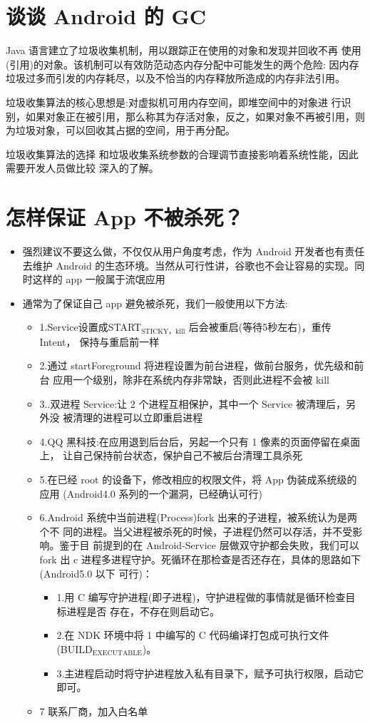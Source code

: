 \documentclass[9pt, b5paper]{article}
\begin{document}
\section{谈谈 Android 的 GC}
\label{sec-13}
Java 语言建立了垃圾收集机制，用以跟踪正在使用的对象和发现并回收不再 使用(引用)的对象。该机制可以有效防范动态内存分配中可能发生的两个危险: 因内存垃圾过多而引发的内存耗尽，以及不恰当的内存释放所造成的内存非法引用。

垃圾收集算法的核心思想是:对虚拟机可用内存空间，即堆空间中的对象进 行识别，如果对象正在被引用，那么称其为存活对象，反之，如果对象不再被引用，则为垃圾对象，可以回收其占据的空间，用于再分配。

垃圾收集算法的选择 和垃圾收集系统参数的合理调节直接影响着系统性能，因此需要开发人员做比较 深入的了解。

\section{怎样保证 App 不被杀死？}
\label{sec-14}
\begin{itemize}
\item 强烈建议不要这么做，不仅仅从用户角度考虑，作为 Android 开发者也有责任去维护 Android 的生态环境。当然从可行性讲，谷歌也不会让容易的实现。同 时这样的 app 一般属于流氓应用
\item 通常为了保证自己 app 避免被杀死，我们一般使用以下方法:
\begin{itemize}
\item 1.Service设置成START$_{\text{STICKY，kill}}$ 后会被重启(等待5秒左右)，重传Intent， 保持与重启前一样
\item 2.通过 startForeground 将进程设置为前台进程，做前台服务，优先级和前台 应用一个级别，除非在系统内存非常缺，否则此进程不会被 kill
\item 3..双进程 Service:让 2 个进程互相保护，其中一个 Service 被清理后，另外没 被清理的进程可以立即重启进程
\item 4.QQ 黑科技:在应用退到后台后，另起一个只有 1 像素的页面停留在桌面上， 让自己保持前台状态，保护自己不被后台清理工具杀死
\item 5.在已经 root 的设备下，修改相应的权限文件，将 App 伪装成系统级的应用 (Android4.0 系列的一个漏洞，已经确认可行)
\item 6.Android 系统中当前进程(Process)fork 出来的子进程，被系统认为是两个不 同的进程。当父进程被杀死的时候，子进程仍然可以存活，并不受影响。鉴于目 前提到的在 Android-Service 层做双守护都会失败，我们可以 fork 出 c 进程多进程守护。死循环在那检查是否还存在，具体的思路如下(Android5.0 以下 可行)：
\begin{itemize}
\item 1.用 C 编写守护进程(即子进程)，守护进程做的事情就是循环检查目标进程是否 存在，不存在则启动它。
\item 2.在 NDK 环境中将 1 中编写的 C 代码编译打包成可执行文件 (BUILD$_{\text{EXECUTABLE}}$)。
\item 3.主进程启动时将守护进程放入私有目录下，赋予可执行权限，启动它即可。
\end{itemize}
\item 7 联系厂商，加入白名单
\end{itemize}
\end{itemize}
\end{document}
